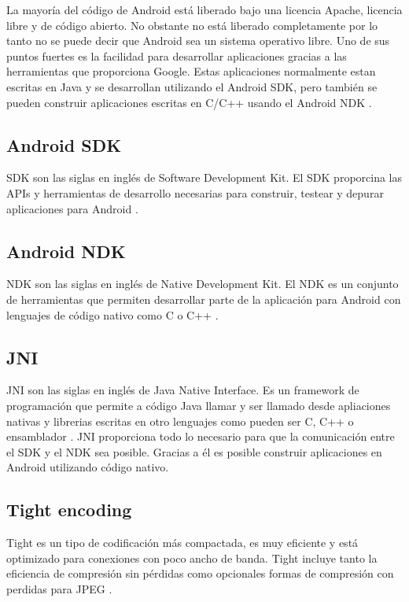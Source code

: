 La mayoría del código de Android está liberado bajo una licencia Apache, licencia libre y de código abierto. No obstante no está liberado completamente por lo tanto no se puede decir que Android sea un sistema operativo libre. Uno de sus puntos fuertes es la facilidad para desarrollar aplicaciones gracias a las herramientas que proporciona Google. Estas aplicaciones normalmente estan escritas en Java y se desarrollan utilizando el Android SDK, pero también se pueden construir aplicaciones escritas en C/C++ usando el Android NDK \cite{wiki:Android}.\\

\subsection{Android SDK}

SDK son las siglas en inglés de Software Development Kit. El SDK proporcina las APIs y herramientas de desarrollo necesarias para construir, testear y depurar aplicaciones para Android \cite{SDK:SDK}.\\

\subsection{Android NDK}

NDK son las siglas en inglés de Native Development Kit. El NDK es un conjunto de herramientas que permiten desarrollar parte de la aplicación para Android con lenguajes de código nativo como C o C++ \cite{NDK:NDK}.\\

\subsection{JNI}

JNI son las siglas en inglés de Java Native Interface. Es un framework de programación que permite a código Java llamar y ser llamado desde apliaciones nativas y librerias escritas en otro lenguajes como pueden ser C, C++ o ensamblador \cite{wiki:jni}. JNI proporciona todo lo necesario para que la comunicación entre el SDK y el NDK sea posible. Gracias a él es posible construir aplicaciones en Android utilizando código nativo.

\subsection{Tight encoding}

Tight es un tipo de codificación más compactada, es muy eficiente y está optimizado para conexiones con poco ancho de banda. Tight  incluye tanto la eficiencia de compresión sin pérdidas como opcionales formas de compresión con perdidas para JPEG \cite{tightpage:tight}.

